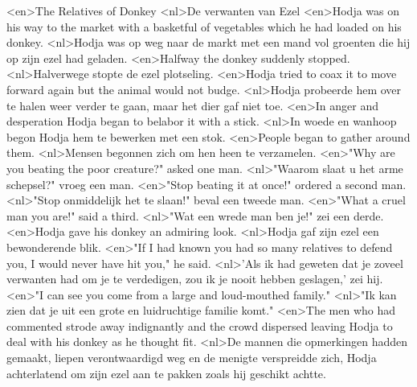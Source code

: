 <en>The Relatives of Donkey
<nl>De verwanten van Ezel
<en>Hodja was on his way to the market with a basketful of vegetables which he had loaded on his donkey.
<nl>Hodja was op weg naar de markt met een mand vol groenten die hij op zijn ezel had geladen.
<en>Halfway the donkey suddenly stopped.
<nl>Halverwege stopte de ezel plotseling.
<en>Hodja tried to coax it to move forward again but the animal would not budge.
<nl>Hodja probeerde hem over te halen weer verder te gaan, maar het dier gaf niet toe.
<en>In anger and desperation Hodja began to belabor it with a stick.
<nl>In woede en wanhoop begon Hodja hem te bewerken met een stok.
<en>People began to gather around them.
<nl>Mensen begonnen zich om hen heen te verzamelen.
<en>"Why are you beating the poor creature?" asked one man.
<nl>"Waarom slaat u het arme schepsel?" vroeg een man.
<en>"Stop beating it at once!" ordered a second man.
<nl>"Stop onmiddelijk het te slaan!" beval een tweede man.
<en>"What a cruel man you are!" said a third.
<nl>"Wat een wrede man ben je!" zei een derde.
<en>Hodja gave his donkey an admiring look.
<nl>Hodja gaf zijn ezel een bewonderende blik.
<en>"If I had known you had so many relatives to defend you, I would never have hit you," he said.
<nl>'Als ik had geweten dat je zoveel verwanten had om je te verdedigen, zou ik je nooit hebben geslagen,' zei hij.
<en>"I can see you come from a large and loud-mouthed family."
<nl>"Ik kan  zien dat je uit een grote en luidruchtige familie komt."
<en>The men who had commented strode away indignantly and the crowd dispersed leaving Hodja to deal with his donkey as he thought fit.
<nl>De mannen die opmerkingen hadden gemaakt, liepen verontwaardigd weg en de menigte verspreidde zich,  Hodja  achterlatend om zijn ezel aan te pakken zoals hij  geschikt achtte.

